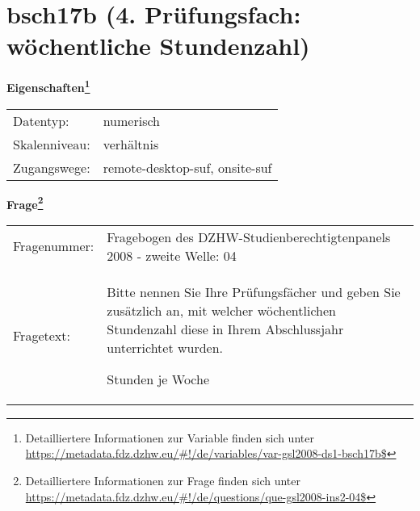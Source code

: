 
    \setcounter{footnote}{0}

    \vspace*{-1.8cm}
	\section{bsch17b (4. Prüfungsfach: wöchentliche Stundenzahl)}
	\label{section:bsch17b}



    \vspace*{0.5cm}
    \noindent\textbf{Eigenschaften\footnote{Detailliertere Informationen zur Variable finden sich unter
		\url{https://metadata.fdz.dzhw.eu/\#!/de/variables/var-gsl2008-ds1-bsch17b$}}}\\
	\begin{tabularx}{\hsize}{@{}lX}
	Datentyp: & numerisch \\
	Skalenniveau: & verhältnis \\
	Zugangswege: &
	  remote-desktop-suf, 
	  onsite-suf
 \\
    \end{tabularx}



				\vspace*{0.5cm}
                \noindent\textbf{Frage\footnote{Detailliertere Informationen zur Frage finden sich unter
		              \url{https://metadata.fdz.dzhw.eu/\#!/de/questions/que-gsl2008-ins2-04$}}}\\
				\begin{tabularx}{\hsize}{@{}lX}
					Fragenummer: &
					  Fragebogen des DZHW-Studienberechtigtenpanels 2008 - zweite Welle:
					  04
 \\
					Fragetext: & Bitte nennen Sie Ihre Prüfungsfächer und geben Sie zusätzlich an, mit welcher wöchentlichen Stundenzahl diese in Ihrem Abschlussjahr unterrichtet wurden.\par  Stunden je Woche \\
				\end{tabularx}





